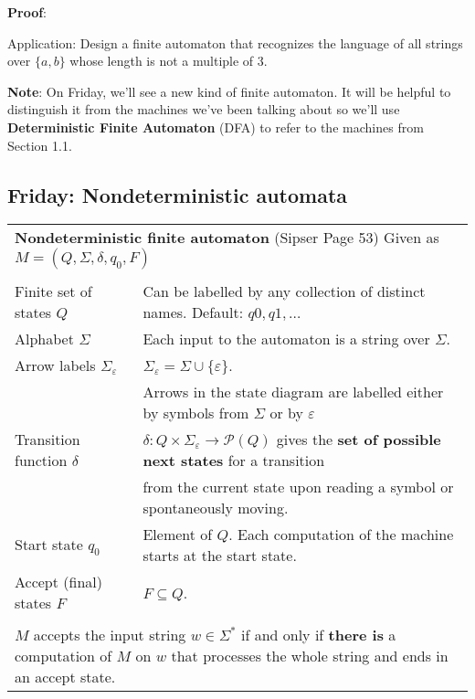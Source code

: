 \documentclass[12pt, oneside]{article}
\begin{document}
{\bf Proof}: 




\vfill

Application: Design a finite automaton that recognizes the language of all strings over $\{a,b\}$
whose length is not a multiple of $3$.

\vfill

{\bf Note}: On Friday, we'll see a new kind of finite automaton. It will be helpful to distinguish it from the
machines we've been talking about so we'll use {\bf Deterministic Finite Automaton} (DFA) to refer to the machines 
from Section 1.1. 

\newpage
\subsection*{Friday: Nondeterministic automata}




\begin{center}
\begin{tabular}{|ll|}
\hline
\multicolumn{2}{|l|}{{\bf Nondeterministic finite automaton}  (Sipser Page 53) Given as $M = (Q, \Sigma, \delta, q_0, F)$}\\
& \\
Finite set of states $Q$  & Can  be labelled by any collection  of distinct names. Default: $q0, q1, \ldots$  \\
Alphabet $\Sigma$ &  Each input to the automaton is a string over  $\Sigma$. \\
Arrow labels $\Sigma_\varepsilon$ &  $\Sigma_\varepsilon = \Sigma \cup \{ \varepsilon\}$. \\
&  Arrows 
in the state diagram are labelled either by symbols from $\Sigma$ or by $\varepsilon$ \\
Transition function $\delta$  & $\delta: Q \times \Sigma_{\varepsilon} \to \mathcal{P}(Q)$
gives the {\bf set of possible next states} for a transition \\
&  from the current state upon reading a symbol or spontaneously moving.\\
Start state $q_0$ & Element of $Q$.  Each computation of the machine starts at the  start  state.\\
Accept (final) states $F$ & $F \subseteq  Q$.\\
& \\
\multicolumn{2}{|p{\textwidth}|}{$M$ accepts the input string $w \in \Sigma^*$ if and only if {\bf there is} a computation of $M$ on 
$w$ that processes the whole string and ends in an
accept state.}\\
\hline
\end{tabular}
\end{center}
\end{document}
